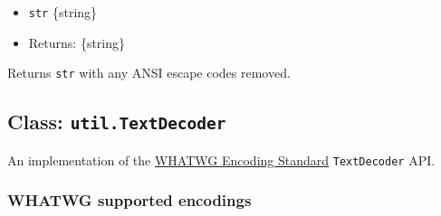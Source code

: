 \begin{itemize}
\tightlist
\item
  \texttt{str} \{string\}
\item
  Returns: \{string\}
\end{itemize}

Returns \texttt{str} with any ANSI escape codes removed.

\begin{Shaded}
\begin{Highlighting}[]
\NormalTok{(}\StringTok{\textquotesingle{}}\StringTok{[4mvalue}\StringTok{[0m\textquotesingle{}}\NormalTok{))}\OperatorTok{;}
\end{Highlighting}
\end{Shaded}

\subsection{\texorpdfstring{Class:
\texttt{util.TextDecoder}}{Class: util.TextDecoder}}\label{class-util.textdecoder}

An implementation of the \href{https://encoding.spec.whatwg.org/}{WHATWG
Encoding Standard} \texttt{TextDecoder} API.

\begin{Shaded}
\begin{Highlighting}[]
\OperatorTok{=}  \NormalTok{()}\OperatorTok{;}
\OperatorTok{=}  \NormalTok{([}\OperatorTok{,} \OperatorTok{,} \OperatorTok{,} \OperatorTok{,} \NormalTok{])}\OperatorTok{;}
\OperatorTok{;} 
\end{Highlighting}
\end{Shaded}

\subsubsection{WHATWG supported
encodings}\label{whatwg-supported-encodings}

